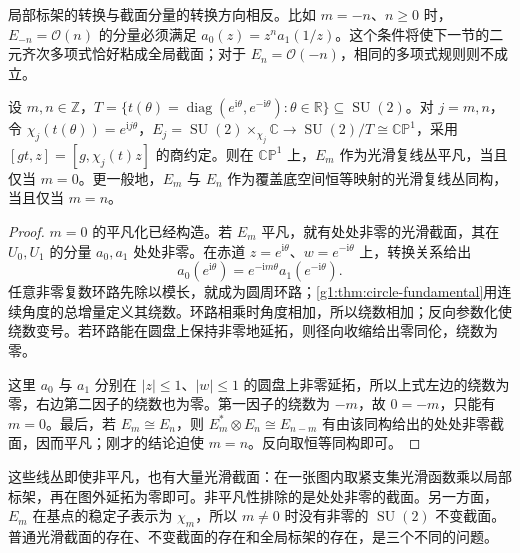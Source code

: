 局部标架的转换与截面分量的转换方向相反。比如 \(m=-n\)、\(n\ge0\) 时，\(E_{-n}=\mathcal O(n)\) 的分量必须满足 \(a_0(z)=z^n a_1(1/z)\)。这个条件将使下一节的二元齐次多项式恰好粘成全局截面；对于 \(E_n=\mathcal O(-n)\)，相同的多项式规则则不成立。

\begin{proposition}\label{g1:prop:projective-line-bundle-winding}
	设 \(m,n\in\mathbb Z\)，\(T=\{t(\theta)=\operatorname{diag}(e^{\mathrm{i}\theta},e^{-\mathrm{i}\theta}):\theta\in\mathbb R\}\subseteq\operatorname{SU}(2)\)。对 \(j=m,n\)，令 \(\chi_j(t(\theta))=e^{\mathrm{i}j\theta}\)，\(E_j=\operatorname{SU}(2)\times_{\chi_j}\mathbb C\to\operatorname{SU}(2)/T\cong\mathbb{CP}^1\)，采用 \([gt,z]=[g,\chi_j(t)z]\) 的商约定。则在 \(\mathbb{CP}^1\) 上，\(E_m\) 作为光滑复线丛平凡，当且仅当 \(m=0\)。更一般地，\(E_m\) 与 \(E_n\) 作为覆盖底空间恒等映射的光滑复线丛同构，当且仅当 \(m=n\)。
\end{proposition}
\begin{proof}
	\(m=0\) 的平凡化已经构造。若 \(E_m\) 平凡，就有处处非零的光滑截面，其在 \(U_0,U_1\) 的分量 \(a_0,a_1\) 处处非零。在赤道 \(z=e^{\mathrm{i}\theta}\)、\(w=e^{-\mathrm{i}\theta}\) 上，转换关系给出
	\[
		a_0(e^{\mathrm{i}\theta})
		=e^{-\mathrm{i}m\theta}a_1(e^{-\mathrm{i}\theta}).
	\]
	任意非零复数环路先除以模长，就成为圆周环路；\cref{g1:thm:circle-fundamental}用连续角度的总增量定义其绕数。环路相乘时角度相加，所以绕数相加；反向参数化使绕数变号。若环路能在圆盘上保持非零地延拓，则径向收缩给出零同伦，绕数为零。

	这里 \(a_0\) 与 \(a_1\) 分别在 \(|z|\le1\)、\(|w|\le1\) 的圆盘上非零延拓，所以上式左边的绕数为零，右边第二因子的绕数也为零。第一因子的绕数为 \(-m\)，故 \(0=-m\)，只能有 \(m=0\)。最后，若 \(E_m\cong E_n\)，则 \(E_m^*\otimes E_n\cong E_{n-m}\) 有由该同构给出的处处非零截面，因而平凡；刚才的结论迫使 \(m=n\)。反向取恒等同构即可。
\end{proof}

这些线丛即使非平凡，也有大量光滑截面：在一张图内取紧支集光滑函数乘以局部标架，再在图外延拓为零即可。非平凡性排除的是处处非零的截面。另一方面，\(E_m\) 在基点的稳定子表示为 \(\chi_m\)，所以 \(m\ne0\) 时没有非零的 \(\operatorname{SU}(2)\) 不变截面。普通光滑截面的存在、不变截面的存在和全局标架的存在，是三个不同的问题。
